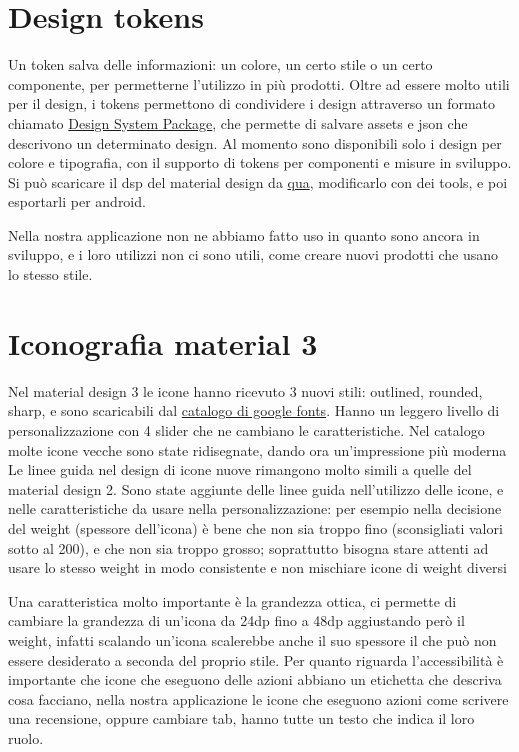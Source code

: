 \documentclass[12pt, a4paper]{report}
\begin{document}
	\section{Design tokens}
		Un token salva delle informazioni: un colore, un certo stile o un certo componente, per permetterne l'utilizzo in più prodotti.
		Oltre ad essere molto utili per il design, i tokens permettono di condividere i design attraverso un formato chiamato \href{https://github.com/AdobeXD/design-system-package-dsp}{Design System Package},
		che permette di salvare assets e json che descrivono un determinato design.
		Al momento sono disponibili solo i design per colore e tipografia, con il supporto di tokens per componenti e misure in sviluppo. Si può scaricare il dsp del material design da \href{https://github.com/material-foundation/material-tokens}{qua}, modificarlo con dei tools, e poi esportarli per android.
		
		Nella nostra applicazione non ne abbiamo fatto uso in quanto sono ancora in sviluppo, e i loro utilizzi non ci sono utili, come creare nuovi prodotti che usano lo stesso stile.
	
	\section{Iconografia material 3}
		Nel material design 3 le icone hanno ricevuto 3 nuovi stili: outlined, rounded, sharp, e sono scaricabili dal \href{https://fonts.google.com/icons}{catalogo di google fonts}. Hanno un leggero livello di personalizzazione con 4 slider che ne cambiano le caratteristiche.
		Nel catalogo molte icone vecche sono state ridisegnate, dando ora un'impressione più moderna
		Le linee guida nel design di icone nuove rimangono molto simili a quelle del material design 2.
		Sono state aggiunte delle linee guida nell'utilizzo delle icone, e nelle caratteristiche da usare nella personalizzazione: per esempio nella decisione del weight (spessore dell'icona) è bene che non sia troppo fino (sconsigliati valori sotto al 200), e che non sia troppo grosso; soprattutto bisogna stare attenti ad usare lo stesso weight in modo consistente e non mischiare icone di weight diversi

		Una caratteristica molto importante è la grandezza ottica, ci permette di cambiare la grandezza di un'icona da 24dp fino a 48dp aggiustando però il weight, infatti scalando un'icona scalerebbe anche il suo spessore il che può non essere desiderato a seconda del proprio stile.
		Per quanto riguarda l'accessibilità è importante che icone che eseguono delle azioni abbiano un etichetta che descriva cosa facciano, nella nostra applicazione le icone che eseguono azioni come scrivere una recensione, oppure cambiare tab, hanno tutte un testo che indica il loro ruolo.
\end{document}
